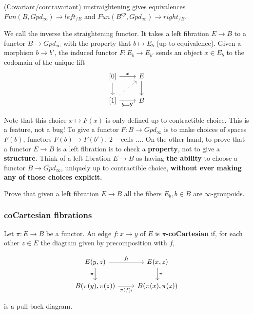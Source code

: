 \begin{theorem}
 (Covariant/contravariant) unstraightening gives equivalences $Fun(B,Gpd_{\infty})\rightarrow left_{/B}$ and $Fun(B^{op},Gpd_\infty)\rightarrow right_{/B}$.
\end{theorem}
We call the inverse the straightening functor. It takes a left fibration $E\rightarrow B$ to a functor $B\rightarrow Gpd_{\infty}$ with the property that $b\mapsto E_b$ (up to equivalence). Given a morphism $b\rightarrow b'$, the induced functor $F:E_b\rightarrow E_{b'}$ sends an object $x\in E_b$ to the codomain of the unique lift 
\[\begin{tikzcd}
	{[0]} & E \\
	{[1]} & B
	\arrow["x", from=1-1, to=1-2]
	\arrow[from=1-1, to=2-1]
	\arrow[from=1-2, to=2-2]
	\arrow[dotted, from=2-1, to=1-2]
	\arrow["{b\rightarrow b'}"', from=2-1, to=2-2]
\end{tikzcd}\]

Note that this choice $x\mapsto F(x)$ is only defined up to contractible choice. This is a feature, not a bug! To give a functor $F:B\rightarrow Gpd_\infty$ is to make choices of spaces $F(b)$, functors $F(b)\rightarrow F(b')$, $2-$cells $\dots.$ On the other hand, to prove that a functor $E\rightarrow B$ is a left fibration is to check a \textbf{property}, not to give a \textbf{structure}. Think of a left fibration $E\rightarrow B$ as having \textbf{the ability} to choose a functor $B\rightarrow Gpd_\infty$, uniquely up to contractible choice, \textbf{without ever making any of those choices explicit.}

\begin{exercise}
    Prove that given a left fibration $E\rightarrow B$ all the fibers $E_b, b\in B$ are $\infty$-groupoids.
\end{exercise}

\subsubsection{coCartesian fibrations}

\begin{definition}
    Let $\pi:E\rightarrow B$ be a functor. An edge $f:x\rightarrow y$ of $E$ is \textbf{$\pi$-coCartesian} if, for each other $z\in E$ the diagram given by precomposition with $f$,

\[\begin{tikzcd}
	{E(y,z)} & {E(x,z)} \\
	{B(\pi(y),\pi(z))} & {B(\pi(x),\pi(z))}
	\arrow["{f_!}", from=1-1, to=1-2]
	\arrow["\pi"', from=1-1, to=2-1]
	\arrow["\pi", from=1-2, to=2-2]
	\arrow["{\pi(f)_!}"', from=2-1, to=2-2]
\end{tikzcd}\]

    is a pull-back diagram.
\end{definition}

